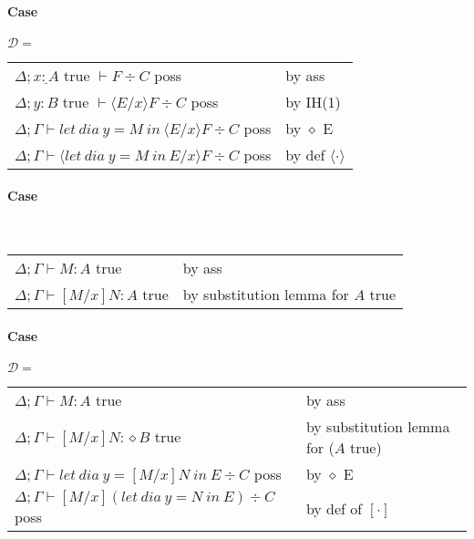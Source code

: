 \documentclass[12 pt]{article}
\begin{document}
    \paragraph{Case} $\mathcal{D} =$
    \noLine
    \noLine
    \DP
    \\
    \begin{tabular}{l l}
      $\Delta; \underline{x : A}$ true $\vdash F \div C$ poss& by ass
      \\ $\Delta; y : B$ true $\vdash \langle E/x \rangle F \div C$ poss & by IH(1)
      \\ $\Delta; \Gamma \vdash let\ dia\ y = M\ in\ \langle E/x \rangle F \div C$ poss & by $\diamond$ E
      \\ $\Delta; \Gamma \vdash \langle let\ dia\ y = M\ in\ E/x \rangle F \div C$ poss & by def $\langle \cdot \rangle$
    \end{tabular}
    \paragraph{Case}
    \noLine
    \DP
    \\
    \begin{tabular}{l l}
      $\Delta; \Gamma \vdash M : A$ true& by ass
      \\ $\Delta; \Gamma \vdash [M/x]N : A$ true & by substitution lemma for $A$ true
    \end{tabular}
    \paragraph{Case} $\mathcal{D} =$
    \noLine
    \noLine
    \DP
    \\
    \begin{tabular}{l l}
      $\Delta; \Gamma \vdash M : A$ true & by ass
      \\ $\Delta; \Gamma \vdash [M/x]N: \diamond B$ true & by substitution lemma for ($A$ true)
      \\ $\Delta; \Gamma \vdash let\ dia\ y = [M/x]N\ in\ E \div C$ poss & by $\diamond$ E
      \\ $\Delta; \Gamma \vdash [M/x](let\ dia\ y = N\ in\ E) \div C$ poss & by def of $[\cdot]$
    \end{tabular}
\end{document}
